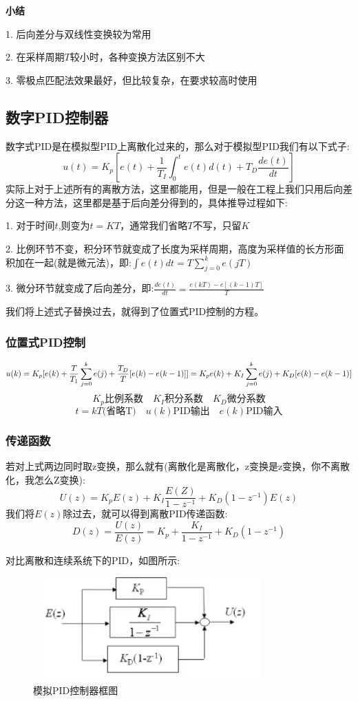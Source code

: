 \documentclass[12pt, a4paper, oneside]{ctexbook}
\begin{document}
\textbf{小结}

1. 后向差分与双线性变换较为常用

2. 在采样周期$T$较小时，各种变换方法区别不大

3. 零极点匹配法效果最好，但比较复杂，在要求较高时使用
\subsection{数字PID控制器} 
数字式PID是在模拟型PID上离散化过来的，那么对于模拟型PID我们有以下式子:
$$
u(t)=K_p[e(t)+\frac{1}{T_I}\int_0^te(t)d(t)+T_D\frac{de(t)}{dt}]
$$
实际上对于上述所有的离散方法，这里都能用，但是一般在工程上我们只用后向差分这一种方法，这里都是基于后向差分得到的，具体推导过程如下:

1. 对于时间$t$,则变为$t=KT$，通常我们省略$T$不写，只留$K$

2. 比例环节不变，积分环节就变成了长度为采样周期，高度为采样值的长方形面积加在一起(就是微元法)，即:$\int e(t)dt=T\sum_{j=0}^ke(jT)$

3. 微分环节就变成了后向差分，即:$\frac{de(t)}{dt}=\frac{e(kT)-e[(k-1)T]}{T}$

\noindent 我们将上述式子替换过去，就得到了位置式PID控制的方程。
\subsubsection{位置式PID控制} 
$$
u(k)=K_p[e(k)+\frac{T}{T_1}\sum^{k}_{j=0}e(j)+\frac{T_D}{T}[e(k)-e(k-1)]]\\
=K_pe(k)+K_I\sum^{k}_{j=0}e(j)+K_D[e(k)-e(k-1)]
$$
$$
K_p \mbox{比例系数}\quad K_I \mbox{积分系数}\quad K_D \mbox{微分系数}
$$
$$
t=kT\mbox{(省略T)}\quad u(k)\mbox{PID输出}\quad e(k)\mbox{PID输入}
$$
\subsubsection{传递函数} 
若对上式两边同时取z变换，那么就有(离散化是离散化，z变换是z变换，你不离散化，我怎么Z变换):
$$
U(z)=K_pE(z)+K_I\frac{E(Z)}{1-z^{-1}}+K_D(1-z^{-1})E(z)
$$
我们将$E(z)$除过去，就可以得到离散PID传递函数:
$$
D(z)=\frac{U(z)}{E(z)}=K_p+\frac{K_I}{1-z^{-1}}+K_D(1-z^{-1})
$$

对比离散和连续系统下的PID，如图所示:
\begin{figure}[htbp]
	\centering
	\includegraphics[width=9cm,height=4cm]{img/5_2.png}
	\caption{模拟PID控制器框图}
\end{figure}
\end{document}
